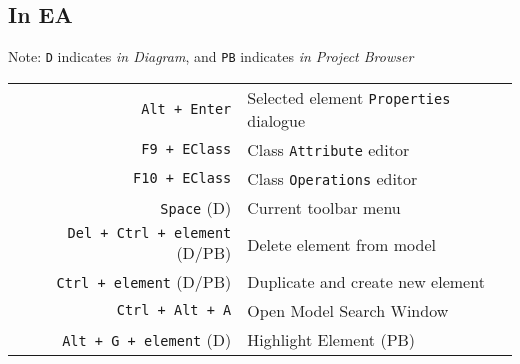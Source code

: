 \vspace{0.5cm}

\subsection{In EA}

{\small Note: \texttt{D} indicates \emph{in Diagram}, and \texttt{PB} indicates \emph{in Project Browser}}

\begin{tabular}{r|l}
\texttt{Alt + Enter} & Selected element \texttt{Properties} dialogue \\
\texttt{F9 + EClass} & Class \texttt{Attribute} editor \\
\texttt{F10 + EClass} & Class \texttt{Operations} editor \\
\texttt{Space} (D) & Current toolbar menu \\
\texttt{Del + Ctrl + element} (D/PB) & Delete element from model\\
\texttt{Ctrl + element} (D/PB) & Duplicate and create new element \\
\texttt{Ctrl + Alt + A} & Open Model Search Window \\
\texttt{Alt + G + element} (D) & Highlight Element (PB) \\
%
\end{tabular}
